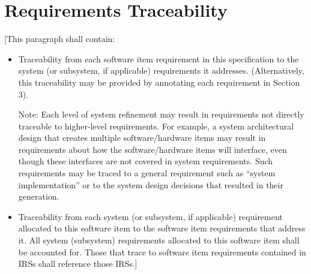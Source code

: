 \chapter{Requirements Traceability\label{ref-032}}

[This paragraph shall contain:

\begin{itemize}
\item Traceability from each software item requirement in this specification to the system (or subsystem, if applicable) requirements it addresses. (Alternatively, this traceability may be provided by annotating each requirement in Section 3).

Note: Each level of system refinement may result in requirements not directly traceable to higher-level requirements. For example, a system architectural design that creates multiple software/hardware items may result in requirements about how the software/hardware items will interface, even though these interfaces are not covered in system requirements. Such requirements may be traced to a general requirement such as ``system implementation'' or to the system design decisions that resulted in their generation.

\item Traceability from each system (or subsystem, if applicable) requirement allocated to this software item to the software item requirements that address it. All system (subsystem) requirements allocated to this software item shall be accounted for. Those that trace to software item requirements contained in IRSs shall reference those IRSs.]

\end{itemize}